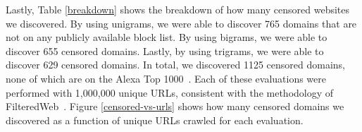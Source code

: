 Lastly, Table \ref{breakdown} shows the breakdown of how many censored
websites we discovered. By using unigrams, we were able to discover
765 domains that are not on any publicly available block list. By
using bigrams, we were able to discover 655 censored domains. Lastly,
by using trigrams, we were able to discover 629 censored domains. In
total, we discovered 1125 censored domains, none of which are on the
Alexa Top 1000~\cite{alexa:top1000}. Each of these evaluations were
performed with 1,000,000 unique URLs, consistent with the methodology
of FilteredWeb~\cite{darer2017filteredweb}. Figure
\ref{censored-vs-urls} shows how many censored domains we discovered
as a function of unique URLs crawled for each evaluation.

\begin{table}[htb]
  \begin{center}
  \end{center}
  \caption{\label{effective-unigrams}Sample of unigrams with
    significant blockrates}
\end{table}


